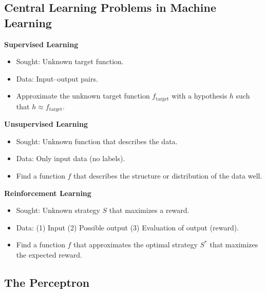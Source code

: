 \subsection{Central Learning Problems in Machine Learning}

\textbf{Supervised Learning}

\begin{itemize}

    \item Sought: Unknown target function.

    \item Data: Input--output pairs.

    \item Approximate the unknown target function \( f_{\text{target}} \) with a hypothesis \( h \) such that \( h \approx f_{\text{target}} \).

\end{itemize}

\textbf{Unsupervised Learning} 

\begin{itemize}
   
    \item Sought: Unknown function that describes the data.

    \item Data: Only input data (no labels).

    \item Find a function \( f \) that describes the structure or distribution of the data well. 
     
\end{itemize}

\textbf{Reinforcement Learning}

\begin{itemize}
    
    \item Sought: Unknown strategy \( S \) that maximizes a reward.
    
    \item Data: (1) Input  (2) Possible output (3) Evaluation of output (reward).
    
    \item Find a function \( f \) that approximates the optimal strategy \( S^* \) that maximizes the expected reward.

\end{itemize}

\subsection{The Perceptron} 

